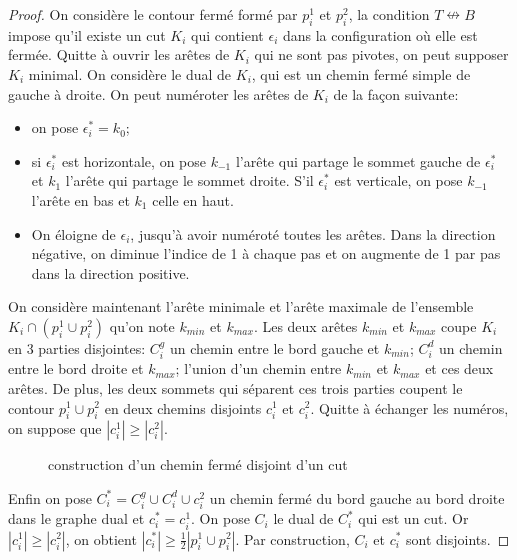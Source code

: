 \documentclass[titlepage,a4paper,11pt]{article}
\newcommand{\nconnect}{\nleftrightarrow}
\begin{document}
\begin{proof}
On considère le contour fermé formé par $p_i^1$ et $p_i^2$, la condition $T\nconnect B$ impose qu'il existe un cut $K_i$ qui contient $\epsilon_i$ dans la configuration où elle est fermée. Quitte à ouvrir les arêtes de $K_i$ qui ne sont pas pivotes, on peut supposer $K_i$ minimal. On considère le dual de $K_i$, qui est un chemin fermé simple de gauche à droite. On peut numéroter les arêtes de $K_i$ de la façon suivante:
\begin{itemize}
\item on pose $\epsilon^*_i = k_0$;
\item si $\epsilon^*_i$ est horizontale, on pose $k_{-1}$ l'arête qui partage le sommet gauche de $\epsilon^*_i$ et $k_1$ l'arête qui partage le sommet droite. S'il $\epsilon_i^*$ est verticale, on pose $k_{-1}$ l'arête en bas et $k_1$ celle en haut.
\item On éloigne de $\epsilon_i$, jusqu'à avoir numéroté toutes les arêtes. Dans la direction négative, on diminue l'indice de 1 à chaque pas et on augmente de 1 par pas dans la direction positive.
\end{itemize}

On considère maintenant l'arête minimale et l'arête maximale de l'ensemble $K_i\cap (p_i^1\cup p_i^2)$ qu'on note $k_{min}$ et $k_{max}$. Les deux arêtes $k_{min}$ et $k_{max}$ coupe $K_i$ en 3 parties disjointes: $C^g_i$ un chemin entre le bord gauche et $k_{min}$; $C^d_i$ un chemin entre le bord droite et $k_{max}$; l'union d'un chemin entre $k_{min}$ et $k_{max}$ et ces deux arêtes. De plus, les deux sommets qui séparent ces trois parties coupent le contour $p_i^1\cup p_i^2$ en deux chemins disjoints $c_i^1$ et $c_i^2$. Quitte à échanger les numéros, on suppose que $|c_i^1| \geqslant |c_i^2|$.
\begin{figure}[h]
\center
{}
\caption{construction d'un chemin fermé disjoint d'un cut}
\end{figure}

Enfin on pose $C^*_i = C^g_i \cup C^d_i \cup c_i^2$ un chemin fermé du bord gauche au bord droite dans le graphe dual et $c_i^* = c_i^1$. On pose $C_i$ le dual de $C^*_i$ qui est un cut. Or $|c_i^1| \geqslant |c_i^2|$, on obtient $|c^*_i| \geqslant \frac{1}{2}|p_i^1\cup p_i^2|$. Par construction, $C_i$ et $c_i^*$ sont disjoints.
\end{proof}
\end{document}

